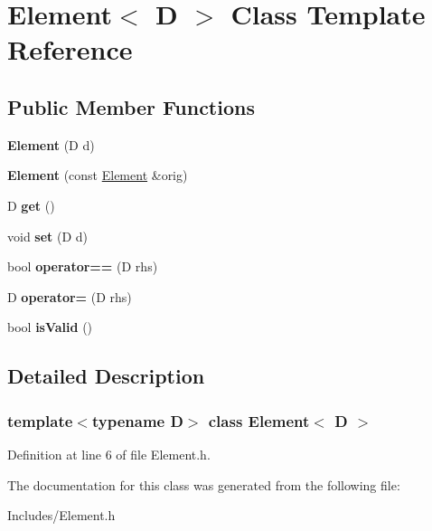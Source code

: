 \hypertarget{class_element}{}\section{Element$<$ D $>$ Class Template Reference}
\label{class_element}
\subsection*{Public Member Functions}
\begin{DoxyCompactItemize}
\item 
\mbox{\label{class_element_a4dff9b63467ee6287327b255396f0988}} 
{\bfseries Element} (D d)
\item 
\mbox{\label{class_element_a2a953047eeec5513b8942a02570f7ced}} 
{\bfseries Element} (const \hyperlink{class_element}{Element} \&orig)
\item 
\mbox{\label{class_element_a346f8fee69720a230e3374c844d18f3e}} 
D {\bfseries get} ()
\item 
\mbox{\label{class_element_a5327720f91a6006429b6b3a2eec46aaa}} 
void {\bfseries set} (D d)
\item 
\mbox{\label{class_element_a26ca0bf7130ed93df363576b9666ceeb}} 
bool {\bfseries operator==} (D rhs)
\item 
\mbox{\label{class_element_a18998203e5826498188b22b859927839}} 
D {\bfseries operator=} (D rhs)
\item 
\mbox{\label{class_element_a6f2ef9738bbc11107dc0e40366197189}} 
bool {\bfseries is\+Valid} ()
\end{DoxyCompactItemize}


\subsection{Detailed Description}
\subsubsection*{template$<$typename D$>$\newline
class Element$<$ D $>$}



Definition at line 6 of file Element.\+h.



The documentation for this class was generated from the following file\+:\begin{DoxyCompactItemize}
\item 
Includes/Element.\+h\end{DoxyCompactItemize}
